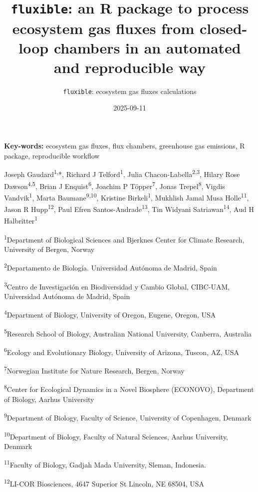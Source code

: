 \documentclass[
  letterpaper,
  DIV=11,
  numbers=noendperiod]{scrartcl}
\title{\texttt{fluxible}: an R package to process ecosystem gas fluxes
from closed-loop chambers in an automated and reproducible way}
\subtitle{\texttt{fluxible}: ecosystem gas fluxes calculations}
\author{}
\date{2025-09-11}
\begin{document}
\maketitle


\textbf{Key-words:} ecosystem gas fluxes, flux chambers, greenhouse gas
emissions, R package, reproducible workflow

Joseph Gaudard\textsuperscript{1,}*, Richard J
Telford\textsuperscript{1}, Julia Chacon-Labella\textsuperscript{2,3},
Hilary Rose Dawson\textsuperscript{4,5}, Brian J
Enquist\textsuperscript{6}, Joachim P Töpper\textsuperscript{7}, Jonas
Trepel\textsuperscript{8}, Vigdis Vandvik\textsuperscript{1}, Marta
Baumane\textsuperscript{9,10}, Kristine Birkeli\textsuperscript{1},
Mukhlish Jamal Musa Holle\textsuperscript{11}, Jason R
Hupp\textsuperscript{12}, Paul Efren Santos-Andrade\textsuperscript{13},
Tin Widyani Satriawan\textsuperscript{14}, Aud H
Halbritter\textsuperscript{1}

\textsuperscript{1}Department of Biological Sciences and Bjerknes Center
for Climate Research, University of Bergen, Norway

\textsuperscript{2}Departamento de Biología. Universidad Autónoma de
Madrid, Spain

\textsuperscript{3}Centro de Investigación en Biodiversidad y Cambio
Global, CIBC-UAM, Universidad Autónoma de Madrid, Spain

\textsuperscript{4}Department of Biology, University of Oregon, Eugene,
Oregon, USA

\textsuperscript{5}Research School of Biology, Australian National
University, Canberra, Australia

\textsuperscript{6}Ecology and Evolutionary Biology, University of
Arizona, Tuscon, AZ, USA

\textsuperscript{7}Norwegian Institute for Nature Research, Bergen,
Norway

\textsuperscript{8}Center for Ecological Dynamics in a Novel Biosphere
(ECONOVO), Department of Biology, Aarhus University

\textsuperscript{9}Department of Biology, Faculty of Science, University
of Copenhagen, Denmark

\textsuperscript{10}Department of Biology, Faculty of Natural Sciences,
Aarhus University, Denmark

\textsuperscript{11}Faculty of Biology, Gadjah Mada University, Sleman,
Indonesia.

\textsuperscript{12}LI-COR Biosciences, 4647 Superior St Lincoln, NE
68504, USA
\end{document}
